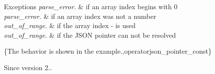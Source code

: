 \begin{DoxyExceptions}{Exceptions}
{\em parse\+\_\+error.} & if an array index begins with \textquotesingle{}0\textquotesingle{} \\
\hline
{\em parse\+\_\+error.} & if an array index was not a number \\
\hline
{\em out\+\_\+of\+\_\+range.} & if the array index \textquotesingle{}-\/\textquotesingle{} is used \\
\hline
{\em out\+\_\+of\+\_\+range.} & if the J\+S\+ON pointer can not be resolved\\
\hline
\end{DoxyExceptions}
\{The behavior is shown in the example.,operatorjson\+\_\+pointer\+\_\+const\}

\begin{DoxySince}{Since}
version 2.. 
\end{DoxySince}
